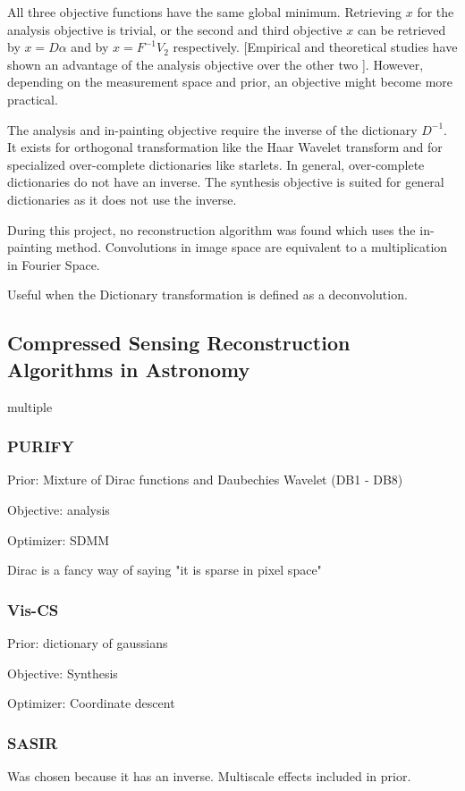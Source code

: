 All three objective functions have the same global minimum. Retrieving $x$ for the analysis objective is trivial, or the second and third objective $x$ can be retrieved by $x = D\alpha$ and by $x = F^{-1}V_2$ respectively. [Empirical and theoretical studies have shown an advantage of the analysis objective over the other two \cite{something}]. However, depending on the measurement space and prior, an objective might become more practical. 

The analysis and in-painting objective require the inverse of the dictionary $D^{-1}$. It exists for orthogonal transformation like the Haar Wavelet transform and for specialized over-complete dictionaries like starlets. In general, over-complete dictionaries do not have an inverse. The synthesis objective is suited for general dictionaries as it does not use the inverse.

During this project, no reconstruction algorithm was found which uses the in-painting method. 
Convolutions in image space are equivalent to a multiplication in Fourier Space.

Useful when the Dictionary transformation is defined as a deconvolution.


\subsection{Compressed Sensing Reconstruction Algorithms in Astronomy}
multiple 

\subsubsection{PURIFY}
Prior: Mixture of Dirac functions and Daubechies Wavelet (DB1 - DB8)

Objective: analysis

Optimizer: SDMM

Dirac is a fancy way of saying "it is sparse in pixel space"


\subsubsection{Vis-CS}
Prior: dictionary of gaussians

Objective: Synthesis

Optimizer: Coordinate descent


\subsubsection{SASIR}
Was chosen because it has an inverse. Multiscale effects included in prior.


